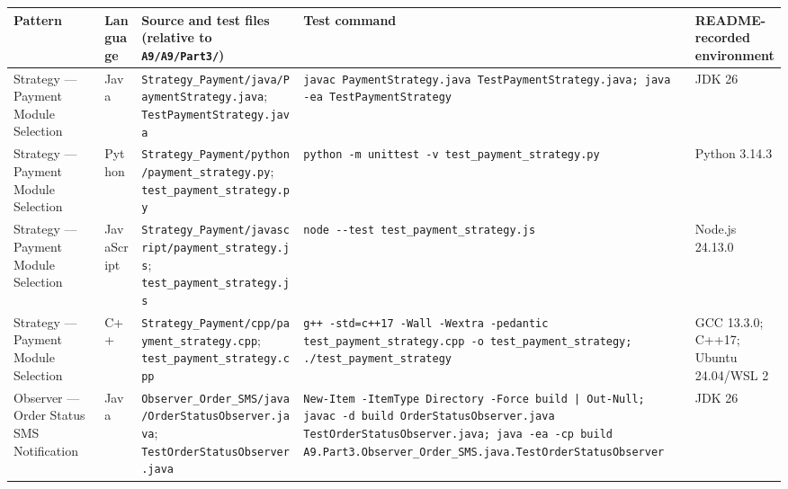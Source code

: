 \documentclass[11pt,a4paper]{article}
\newcommand{\tsmall}{\small\setlength{\tabcolsep}{3pt}}
\begin{document}
\begingroup\tsmall
\begin{longtable}{@{}P{1.9cm}P{1.5cm}P{4.4cm}P{5.6cm}P{2.6cm}@{}}
\toprule
\textbf{Pattern} & \textbf{Language} & \textbf{Source and test files (relative to \texttt{A9/A9/Part3/})} & \textbf{Test command} & \textbf{README-recorded environment}\\
\midrule
\endhead
Strategy --- Payment Module Selection & Java & \texttt{Strategy\_\allowbreak{}Payment/\allowbreak{}java/\allowbreak{}PaymentStrategy.\allowbreak{}java}; \texttt{TestPaymentStrategy.\allowbreak{}java} & \texttt{javac PaymentStrategy.\allowbreak{}java TestPaymentStrategy.\allowbreak{}java; java -\allowbreak{}ea TestPaymentStrategy} & JDK 26\\
Strategy --- Payment Module Selection & Python & \texttt{Strategy\_\allowbreak{}Payment/\allowbreak{}python/\allowbreak{}payment\_\allowbreak{}strategy.\allowbreak{}py}; \texttt{test\_\allowbreak{}payment\_\allowbreak{}strategy.\allowbreak{}py} & \texttt{python -\allowbreak{}m unittest -\allowbreak{}v test\_\allowbreak{}payment\_\allowbreak{}strategy.\allowbreak{}py} & Python 3.14.3\\
Strategy --- Payment Module Selection & JavaScript & \texttt{Strategy\_\allowbreak{}Payment/\allowbreak{}javascript/\allowbreak{}payment\_\allowbreak{}strategy.\allowbreak{}js}; \texttt{test\_\allowbreak{}payment\_\allowbreak{}strategy.\allowbreak{}js} & \texttt{node -\allowbreak{}-\allowbreak{}test test\_\allowbreak{}payment\_\allowbreak{}strategy.\allowbreak{}js} & Node.js 24.13.0\\
Strategy --- Payment Module Selection & C++ & \texttt{Strategy\_\allowbreak{}Payment/\allowbreak{}cpp/\allowbreak{}payment\_\allowbreak{}strategy.\allowbreak{}cpp}; \texttt{test\_\allowbreak{}payment\_\allowbreak{}strategy.\allowbreak{}cpp} & \texttt{g++ -\allowbreak{}std=c++17 -\allowbreak{}Wall -\allowbreak{}Wextra -\allowbreak{}pedantic test\_\allowbreak{}payment\_\allowbreak{}strategy.\allowbreak{}cpp -\allowbreak{}o test\_\allowbreak{}payment\_\allowbreak{}strategy; .\allowbreak{}/\allowbreak{}test\_\allowbreak{}payment\_\allowbreak{}strategy} & GCC 13.3.0; C++17; Ubuntu 24.04/WSL 2\\
\midrule
Observer --- Order Status SMS Notification & Java & \texttt{Observer\_\allowbreak{}Order\_\allowbreak{}SMS/\allowbreak{}java/\allowbreak{}OrderStatusObserver.\allowbreak{}java}; \texttt{TestOrderStatusObserver.\allowbreak{}java} & \texttt{New-\allowbreak{}Item -\allowbreak{}ItemType Directory -\allowbreak{}Force build | Out-\allowbreak{}Null; javac -\allowbreak{}d build OrderStatusObserver.\allowbreak{}java TestOrderStatusObserver.\allowbreak{}java; java -\allowbreak{}ea -\allowbreak{}cp build A9.\allowbreak{}Part3.\allowbreak{}Observer\_\allowbreak{}Order\_\allowbreak{}SMS.\allowbreak{}java.\allowbreak{}TestOrderStatusObserver} & JDK 26\\

\end{longtable}
\end{document}
